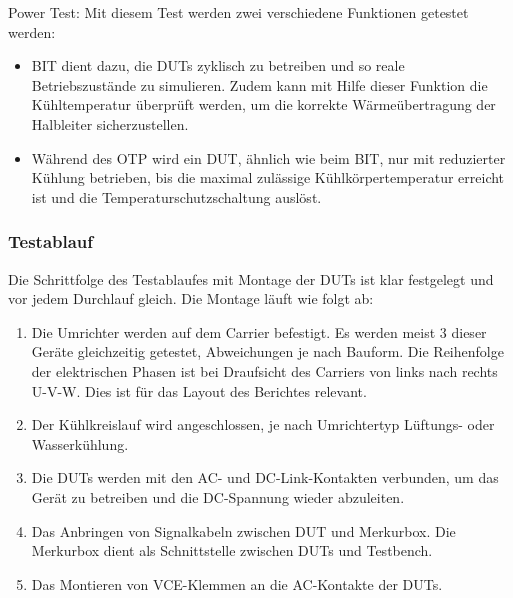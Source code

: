 Power Test:
Mit diesem Test werden zwei verschiedene Funktionen getestet werden:

\begin{itemize}

    \item \ac{BIT} dient dazu, die \ac{DUTs} zyklisch zu betreiben und so reale Betriebszustände zu simulieren.
    Zudem kann mit Hilfe dieser Funktion die Kühltemperatur überprüft werden, um die korrekte Wärmeübertragung der Halbleiter sicherzustellen.
    \item Während des \ac{OTP} wird ein DUT, ähnlich wie beim \ac{BIT}, nur mit reduzierter
    Kühlung betrieben, bis die maximal zulässige Kühlkörpertemperatur erreicht ist und die Temperaturschutzschaltung auslöst.\cite*{Main_Manuel_USTB2018}

\end{itemize}

\subsubsection{Testablauf}
Die Schrittfolge des Testablaufes mit Montage der \ac{DUTs} ist klar festgelegt und vor jedem Durchlauf gleich.
Die Montage läuft wie folgt ab:
\begin{enumerate}

\item Die Umrichter werden auf dem Carrier befestigt. Es werden meist 3 dieser Geräte gleichzeitig getestet, Abweichungen je nach Bauform.
Die Reihenfolge der elektrischen Phasen ist bei Draufsicht des Carriers von links nach rechts U-V-W. Dies ist für das Layout des Berichtes relevant.
\item Der Kühlkreislauf wird angeschlossen, je nach Umrichtertyp Lüftungs- oder Wasserkühlung.
\item Die \ac{DUTs} werden mit den AC- und DC-Link-Kontakten verbunden, um das Gerät zu betreiben und die DC-Spannung wieder abzuleiten.
\item Das Anbringen von Signalkabeln zwischen DUT und Merkurbox. Die Merkurbox dient als Schnittstelle zwischen \ac{DUTs} und Testbench.
\item Das Montieren von VCE-Klemmen an die AC-Kontakte der \ac{DUTs}.

\end{enumerate}

